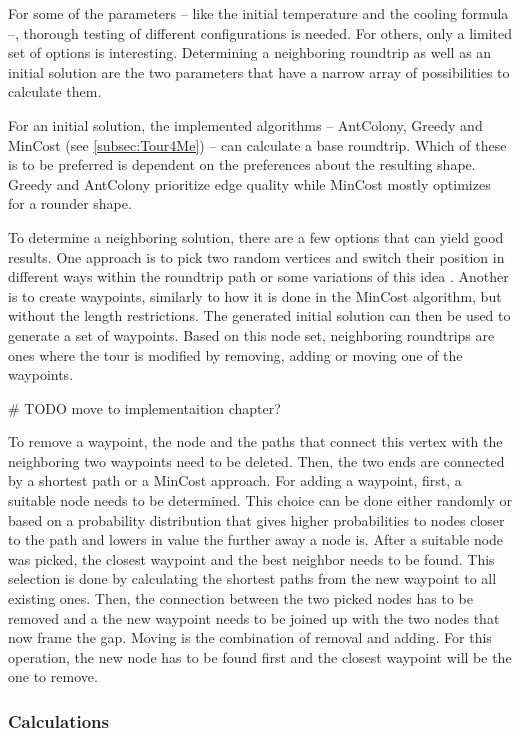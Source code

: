 For some of the parameters -- like the initial temperature and the cooling formula --, thorough testing of different configurations is needed.
For others, only a limited set of options is interesting.
Determining a neighboring roundtrip as well as an initial solution are the two parameters that have a narrow array of possibilities to calculate them.

For an initial solution, the implemented algorithms -- AntColony, Greedy and MinCost (see \ref{subsec:Tour4Me}) -- can calculate a base roundtrip.
Which of these is to be preferred is dependent on the preferences about the resulting shape. 
Greedy and AntColony prioritize edge quality while MinCost mostly optimizes for a rounder shape.

To determine a neighboring solution, there are a few options that can yield good results.
One approach is to pick two random vertices and switch their position in different ways within the roundtrip path or some variations of this idea \cite{zhan_list-based_2016}. 
Another is to create waypoints, similarly to how it is done in the MinCost algorithm, but without the length restrictions.
The generated initial solution can then be used to generate a set of waypoints. 
Based on this node set, neighboring roundtrips are ones where the tour is modified by removing, adding or moving one of the waypoints.

\# TODO move to implementaition chapter?

To remove a waypoint, the node and the paths that connect this vertex with the neighboring two waypoints need to be deleted. 
Then, the two ends are connected by a shortest path or a MinCost approach.
For adding a waypoint, first, a suitable node needs to be determined. 
This choice can be done either randomly or based on a probability distribution that gives higher probabilities to nodes closer to the path and lowers in value the further away a node is.
After a suitable node was picked, the closest waypoint and the best neighbor needs to be found.
This selection is done by calculating the shortest paths from the new waypoint to all existing ones.
Then, the connection between the two picked nodes has to be removed and a the new waypoint needs to be joined up with the two nodes that now frame the gap. 
Moving is the combination of removal and adding.
For this operation, the new node has to be found first and the closest waypoint will be the one to remove.




\subsubsection{Calculations}
\label{subsubsec:SACalculations}

